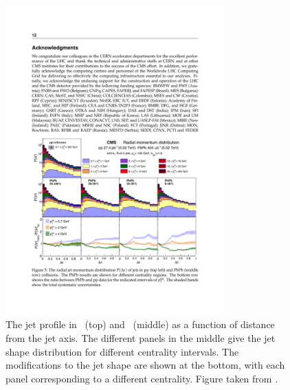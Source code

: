 \begin{figure}[htbp]
\begin{center}
\includegraphics[width=0.75\textwidth]{figures/jetMeasurements/jetshape_cms}
\caption{The jet profile in \pp\ (top) and \pbpb\ (middle) as a function of distance from the jet axis.
The different panels in the middle give the jet shape distribution for different centrality intervals.
The modifications to the jet shape are shown at the bottom, with each panel corresponding to a different centrality.
Figure taken from \cite{Sirunyan:2018jqr}.}
\label{fig:jetshape_cms}
\end{center}
\end{figure}
